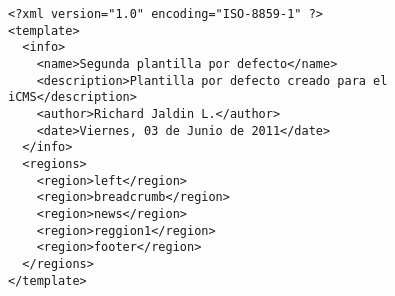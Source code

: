 \begin{lstlisting}[label=jha_plantilla_info,caption=Propiedades de la plantilla.]
<?xml version="1.0" encoding="ISO-8859-1" ?>
<template>
  <info>
    <name>Segunda plantilla por defecto</name>
    <description>Plantilla por defecto creado para el iCMS</description>
    <author>Richard Jaldin L.</author>
    <date>Viernes, 03 de Junio de 2011</date>
  </info>
  <regions>
    <region>left</region>
    <region>breadcrumb</region>
    <region>news</region>
    <region>reggion1</region>
    <region>footer</region>
  </regions>
</template>
\end{lstlisting}
